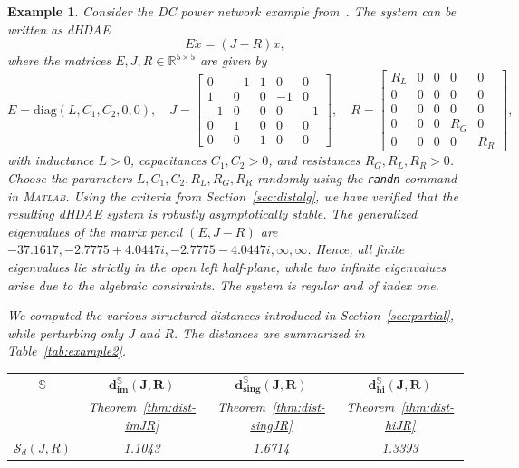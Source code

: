 \documentclass[11pt]{article}
\newtheorem{example}[theorem]{Example}
\begin{document}
\begin{example}{\rm
    Consider the DC power network example from~\cite{MehM19}. The system can be written as dHDAE
    \[
    E\dot{x} = (J - R)x,
    \]
    where the matrices $E, J, R \in \mathbb{R}^{5\times 5}$ are given by
    \[
    E = \text{diag}(L, C_1, C_2, 0, 0),\quad
    J = \begin{bmatrix}
    0 & -1 & 1 & 0 & 0 \\
    1 & 0 & 0 & -1 & 0 \\
    -1 & 0 & 0 & 0 & -1 \\
    0 & 1 & 0 & 0 & 0 \\
    0 & 0 & 1 & 0 & 0
    \end{bmatrix},\quad
    R = \begin{bmatrix}
    R_L & 0 & 0 & 0 & 0 \\
    0 & 0 & 0 & 0 & 0 \\
    0 & 0 & 0 & 0 & 0 \\
    0 & 0 & 0 & R_G & 0 \\
    0 & 0 & 0 & 0 & R_R
    \end{bmatrix},
    \]
    with inductance $L>0$, capacitances $C_1,C_2>0$, and resistances $R_G,R_L,R_R>0$. Choose the parameters \(L, C_1, C_2, R_L, R_G, R_R\) randomly using the \texttt{randn} command in \textsc{Matlab}. Using the criteria from Section~\ref{sec:distalg},  we have verified that the resulting dHDAE system is robustly asymptotically stable. The generalized eigenvalues of the matrix pencil $(E, J-R)$ are $-37.1617, -2.7775 + 4.0447i, -2.7775 - 4.0447i, \infty, \infty$.  Hence, all finite eigenvalues lie strictly in the open left half-plane, while two infinite eigenvalues arise due to the algebraic constraints. The system is regular and of index one.

    We computed the various structured distances introduced in Section~\ref{sec:partial},  while perturbing only $J$ and $R$. The distances are summarized in Table~\ref{tab:example2}.
    \begin{table}[h!]
        \centering
        \renewcommand{\arraystretch}{1.5}
        \begin{tabular}{cccc}
            \hline
            \textbf{$\mathbb  S$}
            & $\mathbf{d_{im}^{\mathbb S}(J,R)}$
            & $\mathbf{d_{sing}^{\mathbb S}(J,R)}$
            & $\mathbf{d_{hi}^{\mathbb S}(J,R)}$ \\

            & Theorem~\ref{thm:dist-imJR}
            & Theorem~\ref{thm:dist-singJR}
            & Theorem~\ref{thm:dist-hiJR}\\
            \hline
            $\mathcal S_d(J,R)$
            & 1.1043
            & 1.6714
            & 1.3393     \\


\end{tabular}
\end{table}}
\end{example}
\end{document}
